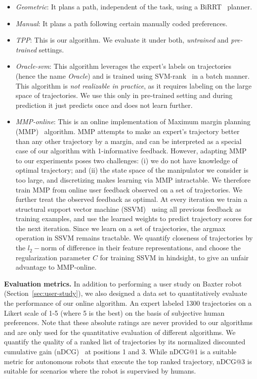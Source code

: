 \begin{itemize}[leftmargin=*]

\item \emph{Geometric}: It plans a path, independent of the task, using a BiRRT~\citep{Lavalle01} planner.
\item \emph{Manual}:  It plans a path following certain manually coded preferences.
\item \emph{TPP}:  This is our algorithm. We evaluate it under both, \emph{untrained} and \emph{pre-trained} settings.
\item \emph{Oracle-svm}: This algorithm leverages the expert's labels on trajectories (hence the name \textit{Oracle}) and is trained using SVM-rank~\citep{Joachims06} in a batch manner. This algorithm is \emph{not realizable in practice}, as it requires labeling on the large space of trajectories. We use this only in pre-trained setting and during prediction it just predicts once and does not learn further.
\item \emph{MMP-online}: This is an online implementation of Maximum margin planning (MMP)~\citep{Ratliff06,Ratliff09a} algorithm. MMP attempts to make an expert's trajectory better than any other trajectory by a margin, and can be interpreted as a special case of our algorithm with 1-informative feedback. However, adapting MMP to our experiments poses two challenges: (i) we do not have knowledge of optimal trajectory; and (ii) the state space of the manipulator we consider is too large, and discretizing makes learning via MMP intractable. We therefore train MMP from online user feedback observed on a set of trajectories. We further treat the observed feedback as optimal. At every iteration we train a structural support vector machine (SSVM)~\cite{Joachims09} using all previous feedback as training examples, and use the learned weights to predict trajectory scores for the next iteration. Since we learn on a set of trajectories, the argmax operation in SSVM remains tractable.  We quantify closeness of trajectories by the $l_2-$norm of difference in their feature representations, and choose the regularization parameter $C$ for training SSVM in hindsight, to give an unfair advantage to MMP-online.
\end{itemize}

\textbf{Evaluation metrics.} In addition to performing a user study on Baxter robot (Section~\ref{sec:user-study}), we also designed a data set to quantitatively evaluate the performance of our online algorithm. An expert labeled 1300 trajectories on a Likert scale of 1-5 (where 5 is the best) on the basis of subjective human preferences. Note that these absolute ratings are never provided to our algorithms and are only used for the quantitative evaluation of different algorithms. We quantify the quality of a ranked list of trajectories by its normalized discounted cumulative gain (nDCG)~\citep{Manning08} at positions 1 and 3. While nDCG@1 is a suitable metric for autonomous robots that execute the top ranked trajectory, nDCG@3 is suitable for scenarios where the robot is supervised by humans.

